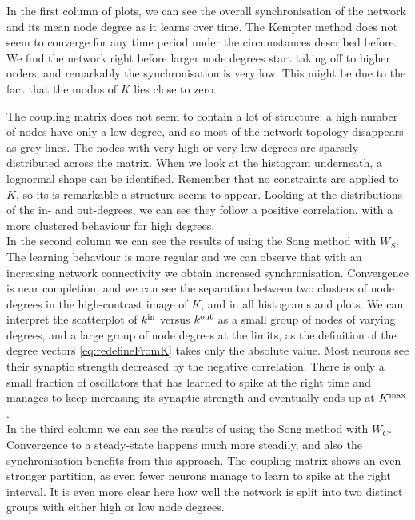 In the first column of plots, we can see the overall synchronisation of the network and its mean node degree as it learns over time. The Kempter method does not seem to converge for any time period under the circumstances described before. We find the network right before larger node degrees start taking off to higher orders, and remarkably the synchronisation is very low. This might be due to the fact that the modus of $K$ lies close to zero.

The coupling matrix does not seem to contain a lot of structure: a high number of nodes have only a low degree, and so most of the network topology disappears as grey lines. The nodes with very high or very low degrees are sparsely distributed across the matrix. When we look at the histogram underneath, a lognormal shape can be identified. Remember that no constraints are applied to $K$, so its is remarkable a structure seems to appear. Looking at the distributions of the in- and out-degrees, we can see they follow a positive correlation, with a more clustered behaviour for high degrees. \\

In the second column we can see the results of using the Song method with $W_S$. The learning behaviour is more regular and we can observe that with an increasing network connectivity we obtain increased synchronisation. Convergence is near completion, and we can see the separation between two clusters of node degrees in the high-contrast image of $K$, and in all histograms and plots. We can interpret the scatterplot of ${k^{\rm in}}$ versus ${k^{\rm out}}$ as a small group of nodes of varying degrees, and a large group of node degrees at the limits, as the definition of the degree vectors \eqref{eq:redefineFromK} takes only the absolute value. Most neurons see their synaptic strength decreased by the negative correlation. There is only a small fraction of oscillators that has learned to spike at the right time and manages to keep increasing its synaptic strength and eventually ends up at $K^{\rm max}$. \\%

In the third column we can see the results of using the Song method with $W_C$. Convergence to a steady-state happens much more steadily, and also the synchronisation benefits from this approach. The coupling matrix shows an even stronger partition, as even fewer neurons manage to learn to spike at the right interval. It is even more clear here how well the network is split into two distinct groups with either high or low node degrees.\\

